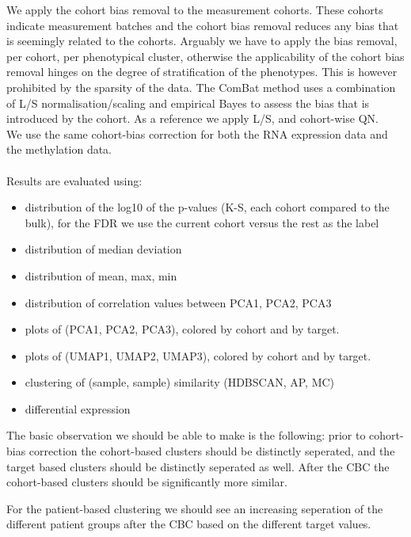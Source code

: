 \documentclass[a4paper,10pt]{article}
\begin{document}
We apply the cohort bias removal to the measurement cohorts. These cohorts indicate measurement batches and the cohort bias removal reduces any bias that is seemingly related to the cohorts. Arguably we have to apply the bias removal, per cohort, per phenotypical cluster, otherwise the applicability of the cohort bias removal hinges on the degree of stratification of the phenotypes. This is however prohibited by the sparsity of the data.
The ComBat method uses a combination of L/S normalisation/scaling and empirical Bayes to assess the bias that is introduced by the cohort. As a reference we apply L/S, and cohort-wise QN.  \\ 
%
We use the same cohort-bias correction for both the RNA expression data and the methylation data. \\ \\
%
Results are evaluated using:
\begin{itemize}
\item distribution of the log10 of the p-values (K-S, each cohort compared to the bulk), for the FDR we use the current cohort versus the rest as the label
\item distribution of median deviation
\item distribution of mean, max, min 
\item distribution of correlation values between PCA1, PCA2, PCA3
\item plots of (PCA1, PCA2, PCA3), colored by cohort and by target.
\item plots of (UMAP1, UMAP2, UMAP3), colored by cohort and by target.
\item clustering of (sample, sample) similarity (HDBSCAN, AP, MC)
\item differential expression
\end{itemize}
%

The basic observation we should be able to make is the following:
prior to cohort-bias correction the cohort-based clusters should be distinctly seperated, 
and the target based clusters should be distinctly seperated as well. After the CBC the cohort-based clusters
should be significantly more similar. 

For the patient-based clustering we should see an increasing seperation of the different patient groups after the CBC based on the different target values.
\end{document}
